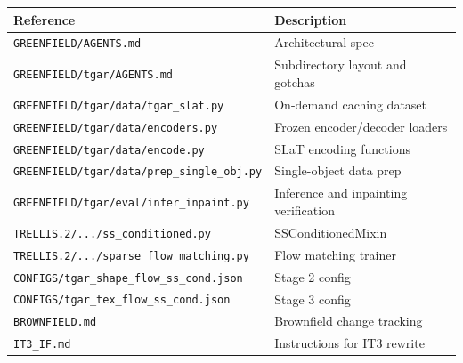 \begin{tabular}{ll}
\toprule
Reference & Description \\
\midrule
\texttt{GREENFIELD/AGENTS.md} & Architectural spec \\
\texttt{GREENFIELD/tgar/AGENTS.md} & Subdirectory layout and gotchas \\
\texttt{GREENFIELD/tgar/data/tgar\_slat.py} & On-demand caching dataset \\
\texttt{GREENFIELD/tgar/data/encoders.py} & Frozen encoder/decoder loaders \\
\texttt{GREENFIELD/tgar/data/encode.py} & SLaT encoding functions \\
\texttt{GREENFIELD/tgar/data/prep\_single\_obj.py} & Single-object data prep \\
\texttt{GREENFIELD/tgar/eval/infer\_inpaint.py} & Inference and inpainting verification \\
\texttt{TRELLIS.2/.../ss\_conditioned.py} & SSConditionedMixin \\
\texttt{TRELLIS.2/.../sparse\_flow\_matching.py} & Flow matching trainer \\
\texttt{CONFIGS/tgar\_shape\_flow\_ss\_cond.json} & Stage 2 config \\
\texttt{CONFIGS/tgar\_tex\_flow\_ss\_cond.json} & Stage 3 config \\
\texttt{BROWNFIELD.md} & Brownfield change tracking \\
\texttt{IT3\_IF.md} & Instructions for IT3 rewrite \\
\bottomrule
\end{tabular}
